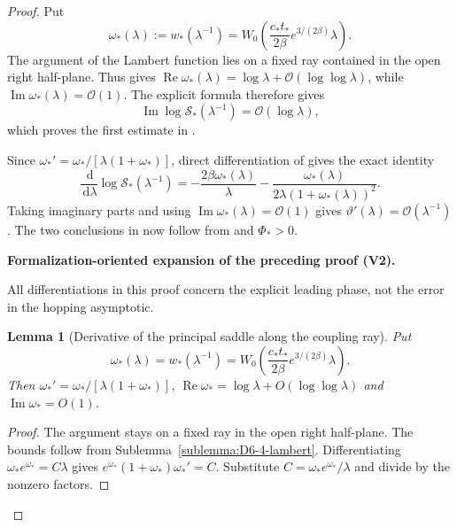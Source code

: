 \documentclass[11pt]{article}
\newtheorem{lemma}[theorem]{Lemma}
\newcommand{\formalisationparentid}{X}
\newenvironment{formalisationaddition}[1]{\par\medskip\begingroup\color{blue}\def\formalisationparentid{#1}\setcounter{formalizationsublemma}{0}\let\lemma\formalizationsublemma\let\endlemma\endformalizationsublemma
  \def\Eo{\mathcal E_h^\circ}\def\EE{\mathcal E_h}\def\phio{\phi_h^\circ}\def\phih{\phi_h}\def\Ho{H_h^{\rm atom}(v^\circ)}\def\Ha{H_h^{\rm atom}}\def\HL{H_h^{L}}\def\Dh{D_h}\def\Log{\operatorname{Log}}\def\ellh{\ell_h}\def\Gp{G_{p,h}}\def\Ast{A_{*,h}}\def\ahat{\widehat{\mathfrak a}_h}\def\ah{\mathfrak a_h}\def\rh{\widehat\rho_h}\def\deltah{\widehat\delta_h}\def\oldref##1{\textup{(##1)}}\def\interface##1{\par\noindent\textit{Analytical interface used here.} ##1\par}\def\finish{\par\noindent\textit{Conclusion of the formalization-oriented expansion.} }\par\noindent\textbf{Formalization-oriented expansion of the preceding proof (V2).}\par\smallskip
}{\par\endgroup\medskip
}
\newcommand{\dd}{\,\mathrm d}
\newcommand{\cO}{\mathcal O}
\newcommand{\Rea}{\operatorname{Re}}
\newcommand{\Ima}{\operatorname{Im}}
\begin{document}
\begin{proof}
Put
\begin{equation}\label{eq:w-star-lambda}
 \omega_*(\lambda)
 :=w_*(\lambda^{-1})
 =W_0\!\left(
 \frac{c_*t_*}{2\beta}e^{3/(2\beta)}\lambda\right).
\end{equation}
The argument of the Lambert function lies on a fixed ray contained in the open
right half-plane.  Thus  gives
$\Rea\omega_*(\lambda)=\log\lambda+\cO(\log\log\lambda)$, while
$\Ima\omega_*(\lambda)=\cO(1)$.  The explicit formula 
therefore gives
\[
 \Ima\log\mathcal S_*(\lambda^{-1})=\cO(\log\lambda),
\]
which proves the first estimate in .

Since
$\omega_*'=\omega_*/[\lambda(1+\omega_*)]$, direct differentiation of
 gives the exact identity
\begin{equation}\label{eq:dlogQ}
 \frac{\dd}{\dd\lambda}\log \mathcal S_*(\lambda^{-1})
 =-\frac{2\beta \omega_*(\lambda)}{\lambda}
 -\frac{\omega_*(\lambda)}{2\lambda(1+\omega_*(\lambda))^2}.
\end{equation}
Taking imaginary parts and using $\Ima\omega_*(\lambda)=\cO(1)$ gives
$\vartheta'(\lambda)=\cO(\lambda^{-1})$.  The two conclusions in
 now follow from  and $\Phi_*>0$.

\begin{formalisationaddition}{L7.3}
All differentiations in this proof concern the explicit leading phase, not the error in the hopping asymptotic.

\begin{lemma}[Derivative of the principal saddle along the coupling ray]\label{sublemma:L7-3-saddle-derivative}
Put
\begin{equation*}
 \omega_*(\lambda)=w_*(\lambda^{-1})
 =W_0\left(\frac{c_*t_*}{2\beta}e^{3/(2\beta)}\lambda\right).
\end{equation*}
Then $\omega_*'=\omega_*/[\lambda(1+\omega_*)]$, $\Rea\omega_*=\log\lambda+O(\log\log\lambda)$ and $\Ima\omega_*=O(1)$.
\end{lemma}
\begin{proof}
The argument stays on a fixed ray in the open right half-plane. The bounds follow from Sublemma~\ref{sublemma:D6-4-lambert}. Differentiating $\omega_*e^{\omega_*}=C\lambda$ gives $e^{\omega_*}(1+\omega_*)\omega_*'=C$. Substitute $C=\omega_*e^{\omega_*}/\lambda$ and divide by the nonzero factors.
\end{proof}


\end{formalisationaddition}
\end{proof}
\end{document}
